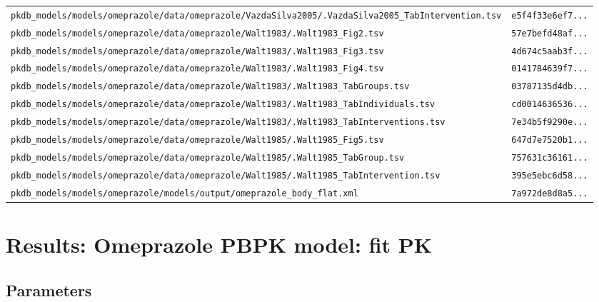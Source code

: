 \begin{longtable}{ll}
\texttt{pkdb\_models/models/omeprazole/data/omeprazole/VazdaSilva2005/.VazdaSilva2005\_TabIntervention.tsv} & \texttt{e5f4f33e6ef7...} \\
\texttt{pkdb\_models/models/omeprazole/data/omeprazole/Walt1983/.Walt1983\_Fig2.tsv} & \texttt{57e7befd48af...} \\
\texttt{pkdb\_models/models/omeprazole/data/omeprazole/Walt1983/.Walt1983\_Fig3.tsv} & \texttt{4d674c5aab3f...} \\
\texttt{pkdb\_models/models/omeprazole/data/omeprazole/Walt1983/.Walt1983\_Fig4.tsv} & \texttt{0141784639f7...} \\
\texttt{pkdb\_models/models/omeprazole/data/omeprazole/Walt1983/.Walt1983\_TabGroups.tsv} & \texttt{03787135d4db...} \\
\texttt{pkdb\_models/models/omeprazole/data/omeprazole/Walt1983/.Walt1983\_TabIndividuals.tsv} & \texttt{cd0014636536...} \\
\texttt{pkdb\_models/models/omeprazole/data/omeprazole/Walt1983/.Walt1983\_TabInterventions.tsv} & \texttt{7e34b5f9290e...} \\
\texttt{pkdb\_models/models/omeprazole/data/omeprazole/Walt1985/.Walt1985\_Fig5.tsv} & \texttt{647d7e7520b1...} \\
\texttt{pkdb\_models/models/omeprazole/data/omeprazole/Walt1985/.Walt1985\_TabGroup.tsv} & \texttt{757631c36161...} \\
\texttt{pkdb\_models/models/omeprazole/data/omeprazole/Walt1985/.Walt1985\_TabIntervention.tsv} & \texttt{395e5ebc6d58...} \\
\texttt{pkdb\_models/models/omeprazole/models/output/omeprazole\_body\_flat.xml} & \texttt{7a972de8d8a5...} \\
\end{longtable}

\section{Results: Omeprazole PBPK model: fit PK}

\subsection{Parameters}

